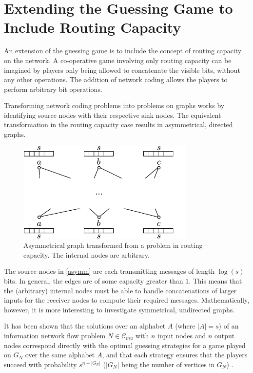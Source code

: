 \section{Extending the Guessing Game to Include Routing Capacity}
\label{sect:rgg}

An extension of the guessing game is to include the concept of routing capacity on the network. A co-operative game involving only routing capacity can be imagined by players only being allowed to concatenate the visible bits, without any other operations. The addition of network coding allows the players to perform arbitrary bit operations.

Transforming network coding problems into problems on graphs works by identifying source nodes with their respective sink nodes. The equivalent transformation in the routing capacity case results in asymmetrical, directed graphs.

\begin{figure}[ht]
	\centering
	\includegraphics[width=250pt]{figures/asymm.pdf}
	\caption[Asymmetrical graph from a routing capacity problem]{Asymmetrical graph transformed from a problem in routing capacity. The internal nodes are arbitrary.}
	\label{asymm}
\end{figure}

The source nodes in \autoref{asymm} are each transmitting messages of length $\log(s)$ bits. In general, the edges are of some capacity greater than $1$. This means that the (arbitrary) internal nodes must be able to handle concatenations of larger inputs for the receiver nodes to compute their required messages. Mathematically, however, it is more interesting to investigate symmetrical, undirected graphs.

It has been shown that the solutions over an alphabet $A$ (where $|A| = s$) of an information network flow problem $N \in \mathcal{C}_{mu}$ with $n$ input nodes and $n$ output nodes correspond directly with the optimal guessing strategies for a game played on $G_N$ over the same alphabet $A$, and that each strategy ensures that the players succeed with probability $s^{n - |G_N|}$ ($|G_N|$ being the number of vertices in $G_N$) \cite{riis2005util, riis2005info}.

